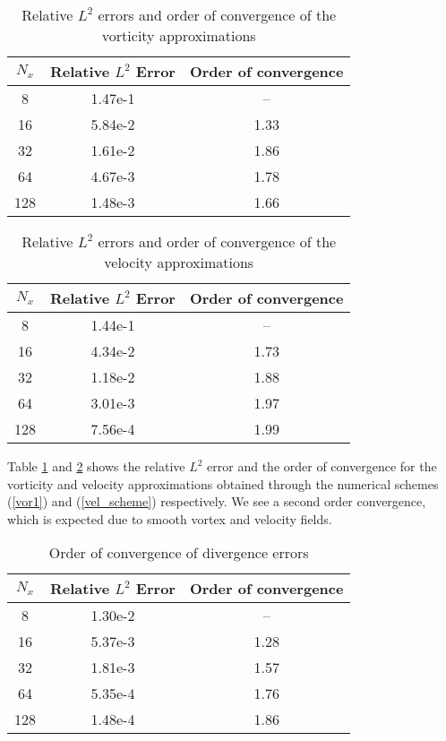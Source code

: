 \documentclass[11pt]{article}
\begin{document}
\begin{table}[H]
\centering
\begin{tabular}{|c| c| c|}
\hline
$N_x$ & Relative $L^2$ Error & Order of convergence\\ [0.5ex]
\hline
8 & 1.47e-1 & -- \\
16 & 5.84e-2 & 1.33\\
32 & 1.61e-2 & 1.86 \\
64 & 4.67e-3 & 1.78\\
128 & 1.48e-3 & 1.66\\[1ex]
\hline
\end{tabular}
\caption{Relative $L^2$ errors and order of convergence of the vorticity approximations	 }
\label{Table_vorticity}
\end{table} 

\begin{table}[H]
\centering
\begin{tabular}{|c| c| c|}
\hline
$N_x$ & Relative $L^2$ Error & Order of convergence\\ [0.5ex]
\hline
8 & 1.44e-1 & -- \\
16 & 4.34e-2 & 1.73\\
32 & 1.18e-2 & 1.88 \\
64 & 3.01e-3 & 1.97\\
128 & 7.56e-4 & 1.99\\[1ex]
\hline
\end{tabular}
\caption{Relative $L^2$ errors and order of convergence of the velocity approximations	 }
\label{Table_velocity}
\end{table} 

Table \ref{Table_vorticity} and \ref{Table_velocity} shows the relative $L^2$ error and the order of convergence for the vorticity and velocity approximations obtained through the numerical schemes (\ref{vor1}) and (\ref{vel_scheme}) respectively. We see a second order convergence, which is expected due to smooth vortex and velocity fields.

\begin{table}[H]
\centering
\begin{tabular}{|c| c| c|}
\hline
$N_x$ & Relative $L^2$ Error & Order of convergence\\ [0.5ex]
\hline
8 & 1.30e-2 & -- \\
16 & 5.37e-3 & 1.28\\
32 & 1.81e-3 & 1.57 \\
64 & 5.35e-4 & 1.76\\
128 & 1.48e-4 & 1.86\\[1ex]
\hline
\end{tabular}
\caption{Order of convergence of divergence errors}
\label{Table_divergence}
\end{table} 
\end{document}
